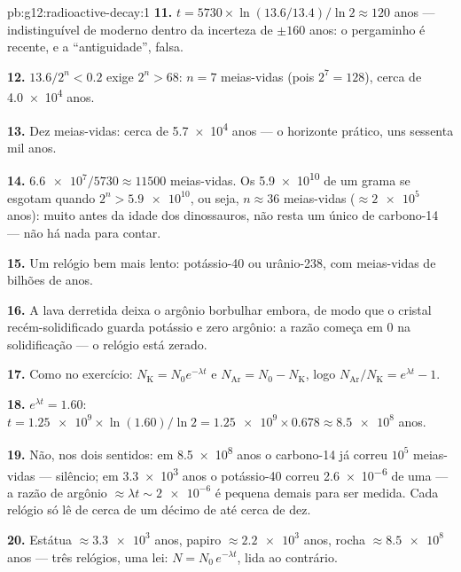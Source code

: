 \begin{solution}{pb:g12:radioactive-decay:1}
\textbf{11.} $t = \num{5730} \times \ln(13.6/13.4)/\ln 2 \approx 120$
anos --- indistinguível de moderno dentro da incerteza de $\pm 160$
anos: o pergaminho é recente, e a ``antiguidade'', falsa.

\textbf{12.} $13.6/2^n < 0.2$ exige $2^n > 68$: $n = 7$ meias-vidas
(pois $2^7 = 128$), cerca de \num{4.0e4} anos.

\textbf{13.} Dez meias-vidas: cerca de \num{5.7e4} anos --- o horizonte
prático, uns sessenta mil anos.

\textbf{14.} $\num{6.6e7}/\num{5730} \approx \num{11500}$ meias-vidas.
Os \num{5.9e10}  de um grama se esgotam quando
$2^n > \num{5.9e10}$, ou seja, $n \approx 36$ meias-vidas
($\approx \num{2e5}$ anos): muito antes da idade dos dinossauros, não
resta um único  de carbono-14 --- não há nada para contar.

\textbf{15.} Um relógio bem mais lento: potássio-40 ou urânio-238, com
meias-vidas de bilhões de anos.

\textbf{16.} A lava derretida deixa o argônio borbulhar embora, de modo
que o cristal recém-solidificado guarda potássio e zero argônio: a razão
começa em $0$ na solidificação --- o relógio está zerado.

\textbf{17.} Como no exercício: $N_{\mathrm K} = N_0 e^{-\lambda t}$ e
$N_{\mathrm{Ar}} = N_0 - N_{\mathrm K}$, logo
$N_{\mathrm{Ar}}/N_{\mathrm K} = e^{\lambda t} - 1$.

\textbf{18.} $e^{\lambda t} = 1.60$:
$t = \num{1.25e9} \times \ln(1.60)/\ln 2 = \num{1.25e9} \times 0.678
\approx \num{8.5e8}$ anos.

\textbf{19.} Não, nos dois sentidos: em \num{8.5e8} anos o carbono-14 já
correu $10^5$ meias-vidas --- silêncio; em \num{3.3e3} anos o
potássio-40 correu \num{2.6e-6} de uma  --- a razão de argônio
$\approx \lambda t \sim \num{2e-6}$ é pequena demais para ser medida.
Cada relógio só lê de cerca de um décimo de  até cerca de dez.

\textbf{20.} Estátua $\approx \num{3.3e3}$ anos, papiro
$\approx \num{2.2e3}$ anos, rocha $\approx \num{8.5e8}$ anos --- três
relógios, uma lei: $N = N_0\,e^{-\lambda t}$, lida ao contrário.
\end{solution}
